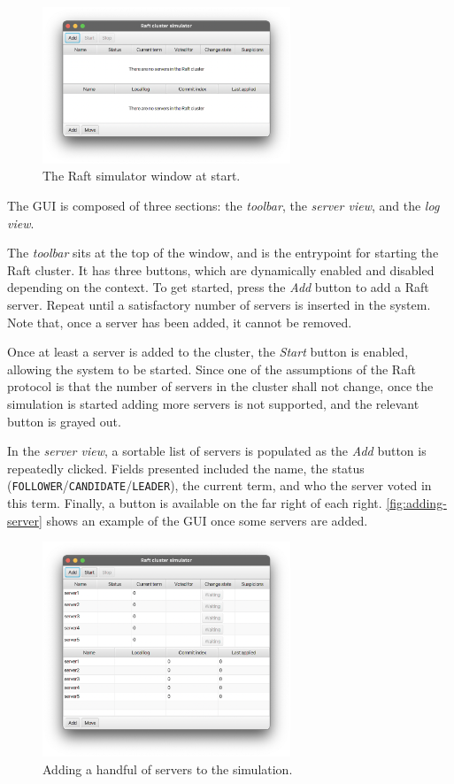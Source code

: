 \begin{figure}[ht]
    \centering
    \includegraphics[width=0.66\textwidth]{drawable/init-page.png}
    \caption{The Raft simulator window at start.}
    \label{fig:raft-start}
\end{figure}

The GUI is composed of three sections: the \textit{toolbar}, the \textit{server view}, and the \textit{log view}.

The \textit{toolbar} sits at the top of the window, and is the entrypoint for starting the Raft cluster. It has three buttons, which are dynamically enabled and disabled depending on the context. To get started, press the \textit{Add} button to add a Raft server. Repeat until a satisfactory number of servers is inserted in the system. Note that, once a server has been added, it cannot be removed.

Once at least a server is added to the cluster, the \textit{Start} button is enabled, allowing the system to be started. Since one of the assumptions of the Raft protocol is that the number of servers in the cluster shall not change, once the simulation is started adding more servers is not supported, and the relevant button is grayed out.

In the \textit{server view}, a sortable list of servers is populated as the \textit{Add} button is repeatedly clicked. Fields presented included the name, the status (\texttt{FOLLOWER}/\texttt{CANDIDATE}/\texttt{LEADER}), the current term, and who the server voted in this term. Finally, a button is available on the far right of each right. \autoref{fig:adding-server} shows an example of the GUI once some servers are added.

\begin{figure}[ht]
    \centering
    \includegraphics[width=0.66\textwidth]{drawable/adding-few-servers.png}
    \caption{Adding a handful of servers to the simulation.}
    \label{fig:adding-server}
\end{figure}

